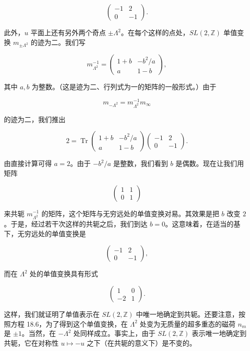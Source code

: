 \[
  \begin{pmatrix}-1&2\\0&-1\end{pmatrix}.
\]

此外，$u$ 平面上还有另外两个奇点 $\pm\Lambda^2$。在每个这样的点处，$SL(2,\mathbb{Z})$ 单值变换 $m_{\pm\Lambda^2}$ 的迹为二。我们写

\[
  m_{\Lambda^2}^{-1}=\begin{pmatrix}1+b&-b^2/a\\ a&1-b\end{pmatrix},
\]

其中 $a,b$ 为整数。（这是迹为二、行列式为一的矩阵的一般形式。）由于

\[
  m_{-\Lambda^2}=m_{\Lambda^2}^{-1}m_\infty
\]

的迹为二，我们推出

\[
  2=\operatorname{Tr}\begin{pmatrix}1+b&-b^2/a\\ a&1-b\end{pmatrix}\begin{pmatrix}-1&2\\0&-1\end{pmatrix}.
\]

由直接计算可得 $a=2$。由于 $-b^2/a$ 是整数，我们看到 $b$ 是偶数。现在让我们用矩阵

\[
  \begin{pmatrix}1&1\\0&1\end{pmatrix}
\]

来共轭 $m_{\Lambda^2}^{-1}$ 的矩阵，这个矩阵与无穷远处的单值变换对易。其效果是把 $b$ 改变 $2$。于是，经过若干次这样的共轭之后，我们到达 $b=0$。这意味着，在适当的基下，无穷远处的单值变换是

\[
  \begin{pmatrix}-1&2\\0&-1\end{pmatrix},
\]

而在 $\Lambda^2$ 处的单值变换具有形式

\[
  \begin{pmatrix}1&0\\-2&1\end{pmatrix}.
\]

这样，我们就证明了单值表示在 $SL(2,\mathbb{Z})$ 中唯一地确定到共轭。还要注意，按照方程 18.6，为了得到这个单值变换，在 $\Lambda^2$ 处变为无质量的超多重态的磁荷 $n_m$ 是 $\pm1$。当然，在 $-\Lambda^2$ 处同样成立。事实上，由于 $SL(2,\mathbb{Z})$ 表示唯一地确定到共轭，它在对称性 $u\mapsto-u$ 之下（在共轭的意义下）是不变的。

